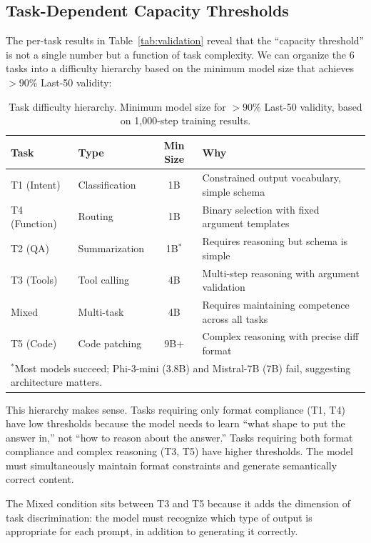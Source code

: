 \documentclass[11pt]{article}
\begin{document}
\subsection{Task-Dependent Capacity Thresholds}
\label{sec:task-thresholds}

The per-task results in Table~\ref{tab:validation} reveal that the ``capacity threshold'' is not a single number but a function of task complexity.  We can organize the 6 tasks into a difficulty hierarchy based on the minimum model size that achieves $>90$\% Last-50 validity:

\begin{table}[t]
\centering
\caption{Task difficulty hierarchy.  Minimum model size for $>90$\% Last-50 validity, based on 1{,}000-step training results.}
\label{tab:task-thresholds}
\begin{tabular}{l l c p{6cm}}
\toprule
\textbf{Task} & \textbf{Type} & \textbf{Min Size} & \textbf{Why} \\
\midrule
T1 (Intent) & Classification & 1B & Constrained output vocabulary, simple schema \\
T4 (Function) & Routing & 1B & Binary selection with fixed argument templates \\
T2 (QA) & Summarization & 1B$^*$ & Requires reasoning but schema is simple \\
T3 (Tools) & Tool calling & 4B & Multi-step reasoning with argument validation \\
Mixed & Multi-task & 4B & Requires maintaining competence across all tasks \\
T5 (Code) & Code patching & 9B+ & Complex reasoning with precise diff format \\
\bottomrule
\multicolumn{4}{l}{\footnotesize $^*$Most models succeed; Phi-3-mini (3.8B) and Mistral-7B (7B) fail, suggesting architecture matters.}
\end{tabular}
\end{table}

This hierarchy makes sense.  Tasks requiring only format compliance (T1, T4) have low thresholds because the model needs to learn ``what shape to put the answer in,'' not ``how to reason about the answer.''  Tasks requiring both format compliance and complex reasoning (T3, T5) have higher thresholds.  The model must simultaneously maintain format constraints and generate semantically correct content.

The Mixed condition sits between T3 and T5 because it adds the dimension of task discrimination: the model must recognize which type of output is appropriate for each prompt, in addition to generating it correctly.
\end{document}
